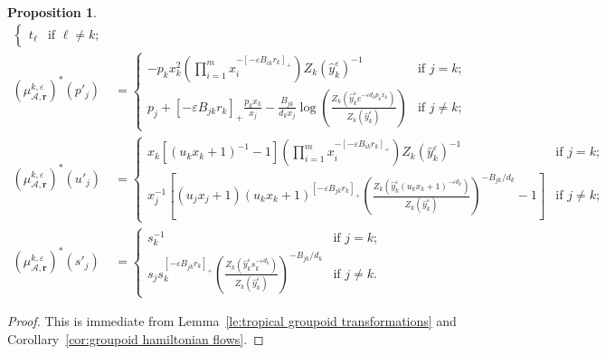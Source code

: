 \documentclass{amsart}
\newtheorem{proposition}[theorem]{Proposition}
\numberwithin{equation}{section}
\newcommand{\bfr}{{\boldsymbol{r}}}
\newcommand{\cA}{\mathcal{A}}
\begin{document}
\begin{proposition}
\begin{align}
\begin{cases}
      t_\ell & \text{if $\ell\ne k$;}
    \end{cases}\\
    \label{eq:GA mutation}
    (\mu_{\cA,\bfr}^{k,\varepsilon})^*(p'_j)&=
    \begin{cases} 
      -p_k x_k^2 \left(\prod_{i=1}^m x_i^{-[-\varepsilon B_{ik} r_k]_+}\right) Z_k(\hat y_k^\varepsilon)^{-1} & \text{if $j=k$;}\\ 
      p_j + [-\varepsilon B_{jk} r_k]_+ \frac{p_k x_k}{x_j} - \frac{B_{jk}}{d_k x_j}\log\left(\frac{Z_k\left(\hat y_k^\varepsilon e^{-\varepsilon d_kp_kx_k}\right)}{Z_k(\hat y_k^\varepsilon)}\right) & \text{if $j\ne k$;}
    \end{cases}\\
    \label{eq:BA mutation}
    (\mu_{\cA,\bfr}^{k,\varepsilon})^*(u'_j)
    &=\begin{cases}
      x_k \left[ (u_k x_k +1)^{-1} -1\right] \left(\prod_{i=1}^m x_i^{-[-\varepsilon B_{ik} r_k]_+}\right) Z_k(\hat y_k^\varepsilon)^{-1} & \text{if $j=k$;}\\ 
      x_j^{-1} \left[ (u_j x_j + 1) (u_k x_k + 1)^{[-\varepsilon B_{jk} r_k]_+} \left(\frac{Z_k\left(\hat y_k^\varepsilon (u_k x_k +1)^{-\varepsilon d_k}\right)}{Z_k(\hat y_k^\varepsilon)}\right)^{-B_{jk}/d_k} - 1\right] & \text{if $j\ne k$;}
    \end{cases}\\
    \label{eq:DA mutation}
    (\mu_{\cA,\bfr}^{k,\varepsilon})^*(s'_j)
    &=\begin{cases} 
      s_k^{-1} & \text{if $j=k$;}\\ 
      s_j s_k^{[-\varepsilon B_{jk} r_k]_+} \left(\frac{Z_k\left(\hat y_k^\varepsilon s_k^{-\varepsilon d_k}\right)}{Z_k(\hat y_k^\varepsilon)}\right)^{-B_{jk}/d_k} & \text{if $j\ne k$.}
    \end{cases}
  \end{align}
\end{proposition}
\begin{proof}
  This is immediate from Lemma~\ref{le:tropical groupoid transformations} and Corollary~\ref{cor:groupoid hamiltonian flows}.
\end{proof}
\end{document}
